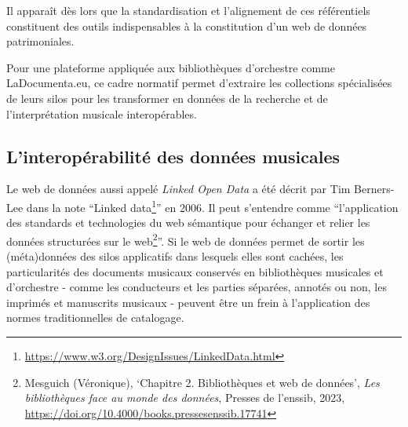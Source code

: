 Il apparaît dès lors que la standardisation et l’alignement de ces référentiels constituent des outils indispensables à la constitution d’un web de données patrimoniales.

Pour une plateforme appliquée aux bibliothèques d’orchestre comme LaDocumenta.eu, ce cadre normatif permet d’extraire les collections spécialisées de leurs silos pour les transformer en données de la recherche et de l’interprétation musicale interopérables.




\subsection*{L'interopérabilité des données musicales}

Le web de données aussi appelé\textit{ Linked Open Data} a été décrit par Tim Berners-Lee dans la note \enquote{Linked data\footnote{\url{https://www.w3.org/DesignIssues/LinkedData.html}}} en 2006. Il peut s'entendre comme \enquote{l'application des standards et technologies du web sémantique pour échanger et relier les données structurées sur le web\footnote{Mesguich (Véronique), \enquote{Chapitre 2. Bibliothèques et web de données}, \textit{Les bibliothèques face au monde des données}, Presses de l’enssib, 2023, \url{https://doi.org/10.4000/books.pressesenssib.17741}}}.  Si le web de données permet de sortir les (méta)données des silos applicatifs dans lesquels elles sont cachées, les particularités des documents musicaux conservés en bibliothèques musicales et d'orchestre - comme les conducteurs et les parties séparées, annotés ou non, les imprimés et manuscrits musicaux - peuvent être un frein à l'application des normes traditionnelles de catalogage. 

